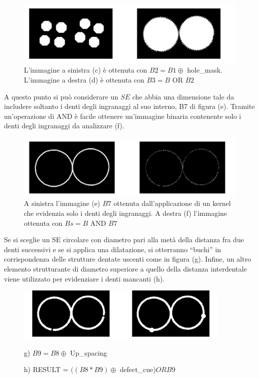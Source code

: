 \begin{figure}[H]
    \centering
    \includegraphics[width=\linewidth, keepaspectratio]{capitoli/immagini/imgs/orologi3.png}
    \caption*{L'immagine a sinistra (c) è ottenuta con $B2 = B1 \oplus$ hole\_mask. L'immagine a destra (d) è ottenuta con $B3 = B \text{ OR } B2$}
\end{figure}

A questo punto si può considerare un $SE$ che abbia una dimensione tale da includere soltanto i denti degli ingranaggi al suo interno,
B7 di figura (e). Tramite un'operazione di AND è facile ottenere un'immagine
binaria contenente solo i denti degli ingranaggi da analizzare (f).

\begin{figure}[H]
    \centering
    \includegraphics[width=\linewidth, keepaspectratio]{capitoli/immagini/imgs/orologi4.png}
    \caption{A sinistra l'immagine (e) $B7$ ottenuta dall'applicazione di un kernel che evidenzia solo i denti degli ingranaggi. A destra (f) l'immagine ottenuta con $Bs = B \text{ AND } B7$}
\end{figure}

Se si sceglie un SE circolare con diametro pari alla metà della distanza fra due denti successivi e se si applica una dilatazione, si
otterranno “buchi” in corrispondenza delle strutture dentate uscenti come in figura (g). Infine, un altro elemento strutturante di diametro superiore a
quello della distanza interdentale viene utilizzato per evidenziare i denti mancanti (h).

\begin{figure}[H]
    \centering
    \includegraphics[width=\linewidth, keepaspectratio]{capitoli/immagini/imgs/orologi5.png}
    \caption*{g) $B9=B8 \oplus$ Up\_spacing}
    \caption*{h) RESULT = $((B8 * B9) \oplus$ defect\_cue)$OR B9$ }
\end{figure}

